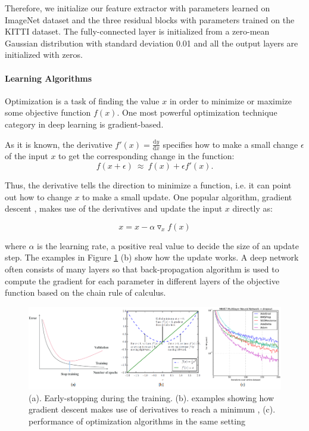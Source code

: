 \documentclass[a4paper,12pt]{article}
\begin{document}
Therefore, we initialize our feature extractor with parameters learned on ImageNet dataset \cite{DBLP:Russakovsky14} and the three residual blocks with parameters trained on the KITTI dataset. The fully-connected layer is initialized from a zero-mean Gaussian distribution with standard deviation 0.01 and all the output layers are initialized with zeros.


\paragraph{Learning Algorithms}

Optimization is a task of finding the value $x$ in order to minimize or maximize some objective function $f(x)$. One most powerful optimization technique category in deep learning is gradient-based.

As it is known, the derivative $f'(x)=\frac{\text{d}y}{\text{d}x}$ specifies how to make a small change $\epsilon$ of the input $x$ to get the corresponding change in the function:
\begin{equation}
	f(x + \epsilon)~ \approx ~ f(x) + \epsilon f'(x).
\end{equation}

Thus, the derivative tells the direction to minimize a function, i.e. it can point out how to change $x$ to make a small update. One popular algorithm, gradient descent \cite{gd1847}, makes use of the derivatives and update the input $x$ directly as:

\begin{equation}
x = x - \alpha {\triangledown} _x f(x)
\end{equation}

where $\alpha$ is the learning rate, a positive real value to decide the size of an update step. The examples in Figure \ref{figure:optimization} (b) show how the update works.  A deep network often consists of many layers so that back-propagation algorithm \cite{Rumelhart:1988:LRB:65669.104451} is used to compute the gradient for each parameter in different layers of the objective function based on the chain rule of calculus.

\begin{figure}[h]		
	\includegraphics[width=1\textwidth]{optimization.png}
	\caption[Optimization]{(a). Early-stopping during the training. (b). examples showing how gradient descent makes use of derivatives to reach a minimum \cite{Goodfellow-et-al-2016}, (c). performance of optimization algorithms in the same setting \cite{DBLP:journals/corr/KingmaB14}}
	\centering
	\label{figure:optimization}
\end{figure}
\end{document}
